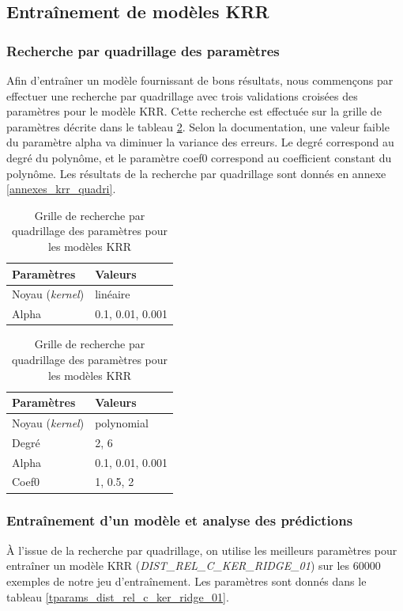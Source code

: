 \subsection{Entraînement de modèles KRR}

\label{dist_rel_krr}

\subsubsection{Recherche par quadrillage des paramètres}
Afin d'entraîner un modèle fournissant de bons résultats, nous commençons par effectuer une recherche par quadrillage avec trois validations croisées des paramètres pour le modèle KRR. Cette recherche est effectuée sur la grille de paramètres décrite dans le tableau \ref{tgrille_quadri_krr}. Selon la documentation, une valeur faible du paramètre alpha va diminuer la variance des erreurs. Le degré correspond au degré du polynôme, et le paramètre coef0 correspond au coefficient constant du polynôme. Les résultats de la recherche par quadrillage sont donnés en annexe \ref{annexes_krr_quadri}.

\begin{table}
	\centering
	
	\begin{tabular}{|l|l|}
		\hline
		\textbf{Paramètres} & \textbf{Valeurs} \\ \hline 
		Noyau (\emph{kernel}) & linéaire\\ \hline
		Alpha & 0.1, 0.01, 0.001 \\ \hline
	\end{tabular}
	
	\vspace{0.5cm}	

	\begin{tabular}{|l|l|}
		\hline
		\textbf{Paramètres} & \textbf{Valeurs} \\ \hline 
		Noyau (\emph{kernel}) & polynomial\\ \hline
		Degré & 2, 6 \\ \hline
		Alpha & 0.1, 0.01, 0.001 \\ \hline
		Coef0 & 1, 0.5, 2 \\ \hline
	\end{tabular}		
	
	\caption{Grille de recherche par quadrillage des paramètres pour les modèles KRR}
	\label{tgrille_quadri_krr}
\end{table}

\subsubsection{Entraînement d'un modèle et analyse des prédictions}
\par À l'issue de la recherche par quadrillage, on utilise les meilleurs paramètres pour entraîner un modèle KRR (\emph{DIST\_REL\_C\_KER\_RIDGE\_01}) sur les 60000 exemples de notre jeu d'entraînement. Les paramètres sont donnés dans le tableau \ref{tparams_dist_rel_c_ker_ridge_01}.

